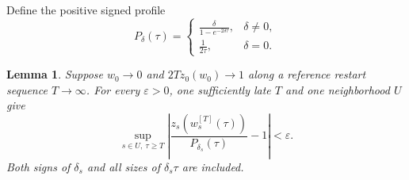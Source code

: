 \documentclass[11pt]{amsart}
\newtheorem{lemma}[theorem]{Lemma}
\theoremstyle{definition}
\theoremstyle{remark}
\begin{document}
Define the positive signed profile
\begin{equation}\label{eq05:profile}
 P_\delta(\tau)=
 \begin{cases}\displaystyle\frac{\delta}{1-e^{-2\delta\tau}},
       &\delta\ne0,\\[5pt]
 \displaystyle\frac1{2\tau},&\delta=0.
 \end{cases}
\end{equation}

\begin{lemma}\label{lem05:scalar}
Suppose \(w_0\to0\) and \(2Tz_0(w_0)\to1\) along a reference
restart sequence \(T\to\infty\). For every \(\varepsilon>0\),
one sufficiently late \(T\) and one neighborhood \(U\) give
\[
 \sup_{s\in U,\ \tau\ge T}
 \left|\frac{z_s(w_s^{[T]}(\tau))}{P_{\delta_s}(\tau)}-1\right|
 <\varepsilon.
\]
Both signs of \(\delta_s\) and all sizes of \(\delta_s\tau\)
are included.
\end{lemma}
\end{document}
